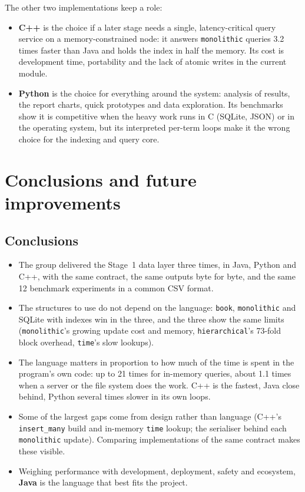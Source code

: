 \documentclass[11pt,a4paper]{article}
\newcommand{\code}[1]{\texttt{#1}}
\begin{document}
The other two implementations keep a role:
\begin{itemize}
  \item \textbf{C++} is the choice if a later stage needs a single, latency-critical query service on a
        memory-constrained node: it answers \code{monolithic} queries 3.2 times faster than Java and
        holds the index in half the memory. Its cost is development time, portability and the lack of
        atomic writes in the current module.
  \item \textbf{Python} is the choice for everything around the system: analysis of results, the
        report charts, quick prototypes and data exploration. Its benchmarks show it is competitive
        when the heavy work runs in C (SQLite, JSON) or in the operating system, but its interpreted
        per-term loops make it the wrong choice for the indexing and query core.
\end{itemize}

\section{Conclusions and future improvements}

\subsection{Conclusions}
\begin{itemize}
  \item The group delivered the Stage~1 data layer three times, in Java, Python and C++, with the
        same contract, the same outputs byte for byte, and the same 12 benchmark experiments in a
        common CSV format.
  \item The structures to use do not depend on the language: \code{book}, \code{monolithic} and
        SQLite with indexes win in the three, and the three show the same limits (\code{monolithic}'s
        growing update cost and memory, \code{hierarchical}'s 73-fold block overhead, \code{time}'s
        slow lookups).
  \item The language matters in proportion to how much of the time is spent in the program's own
        code: up to 21 times for in-memory queries, about 1.1 times when a server or the file system
        does the work. C++ is the fastest, Java close behind, Python several times slower in its own
        loops.
  \item Some of the largest gaps come from design rather than language (C++'s \code{insert\_many}
        build and in-memory \code{time} lookup; the serialiser behind each \code{monolithic} update).
        Comparing implementations of the same contract makes these visible.
  \item Weighing performance with development, deployment, safety and ecosystem, \textbf{Java} is the
        language that best fits the project.
\end{itemize}
\end{document}
